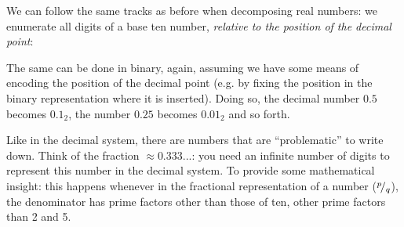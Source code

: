 \begin{plusbox}
We can follow the same tracks as before when decomposing real numbers: we enumerate all digits of a base ten number, \emph{relative to the position of the decimal point}:
\vspace{\parskip}

\begin{defbox}
\begin{center}
\end{center}
\end{defbox}

The same can be done in binary, again, assuming we have some means of encoding the position of the decimal point (e.g. by fixing the position in the binary representation where it is inserted). Doing so, the decimal number $0.5$ becomes $0.1_2$, the number $0.25$ becomes $0.01_2$ and so forth.

Like in the decimal system, there are numbers that are \enquote{problematic} to write down. Think of the fraction  $\approx 0.333...$: you need an infinite number of digits to represent this number in the decimal system. To provide some mathematical insight: this happens whenever in the fractional representation of a number (${}^ {p} \!/_ {q}$), the denominator has prime factors other than those of ten, \ie other prime factors than 2 and 5.


\end{plusbox}
